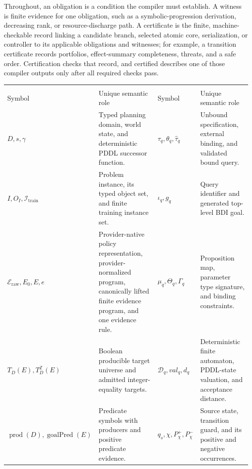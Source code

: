Throughout, an obligation is a condition the compiler must establish. A witness
is finite evidence for one obligation, such as a symbolic-progression derivation,
decreasing rank, or resource-discharge path. A certificate is the finite,
machine-checkable record linking a candidate branch, selected atomic core,
serialization, or controller to its applicable obligations and witnesses; for
example, a transition certificate records portfolios,
effect-summary completeness, threats, and a safe order. Certification checks that
record, and certified describes one of those compiler outputs only after all
required checks pass.

\begin{table}[htbp]
\centering
\small
\setlength{\tabcolsep}{3pt}
\begin{tabular}{@{}
>{\raggedright\arraybackslash}p{}
>{\raggedright\arraybackslash}p{}
>{\raggedright\arraybackslash}p{}
>{\raggedright\arraybackslash}p{}@{}}
\toprule
\multicolumn{2}{c}{Atomic compilation} &
\multicolumn{2}{c}{Temporal composition and execution} \\
Symbol & Unique semantic role & Symbol & Unique semantic role \\
\midrule
$D,s,\gamma$ & Typed planning domain, world state, and deterministic PDDL
successor function. &
$\tau_q,\theta_q,\widehat\tau_q$ & Unbound specification, external binding,
and validated bound query. \\
$I,O_I,\mathcal I_{\mathrm{train}}$ & Problem instance, its typed object set,
and finite training instance set. &
$\iota_q,g_q$ & Query identifier and generated top-level BDI goal. \\
$\mathcal E_{\mathrm{raw}},E_0,E,e$ & Provider-native policy representation,
provider-normalized program, canonically lifted finite evidence program, and
one evidence rule. &
$\mu_q,\Theta_q,\Gamma_q$ & Proposition map, parameter type signature, and
binding constraints. \\
$T_D(E),T_D^{\mathbb Z}(E)$ & Boolean producible target universe and admitted
integer-equality targets. &
$\mathcal D_q,\mathit{val}_q,d_q$ & Deterministic finite automaton, PDDL-state
valuation, and acceptance distance. \\
$\operatorname{prod}(D),\operatorname{goalPred}(E)$ & Predicate symbols with
producers and positive predicate evidence. &
$q_s,\chi,P_\chi^+,P_\chi^-$ & Source state, transition guard, and its positive
and negative occurrences. \\

\end{tabular}
\end{table}
